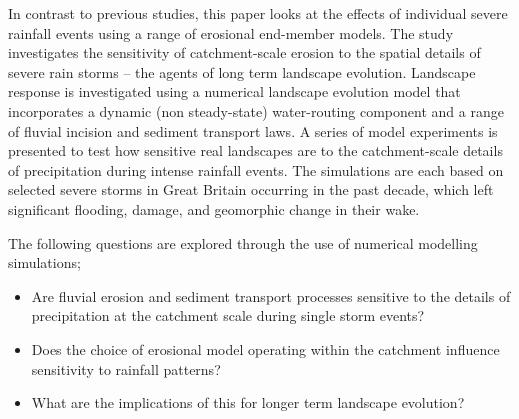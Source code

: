 \documentclass[12pt,oneside,PhD]{muthesis}
\begin{document}

In contrast to previous studies, this paper looks at the effects of individual severe rainfall events using a range of erosional end-member models. The study investigates the sensitivity of catchment-scale erosion to the spatial details of severe rain storms -- the agents of long term landscape evolution. Landscape response is investigated using a numerical landscape evolution model that incorporates a dynamic (non steady-state) water-routing component and a range of fluvial incision and sediment transport laws. A series of model experiments is presented to test how sensitive real landscapes are to the catchment-scale details of precipitation during intense rainfall events. The simulations are each based on selected severe storms in Great Britain occurring in the past decade, which left significant flooding, damage, and geomorphic change in their wake.

The following questions are explored through the use of numerical modelling simulations;

\begin{itemize}
\item Are fluvial erosion and sediment transport processes sensitive to the details of precipitation at the catchment scale during single storm events?
\item Does the choice of erosional model operating within the catchment influence sensitivity to rainfall patterns? 
\item What are the implications of this for longer term landscape evolution? 
\end{itemize}
\end{document}
